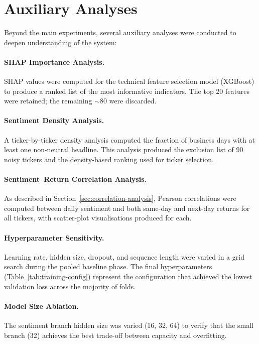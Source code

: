 \section{Auxiliary Analyses}
\label{sec:auxiliary}

Beyond the main experiments, several auxiliary analyses were conducted to
deepen understanding of the system:

\paragraph{SHAP Importance Analysis.}
SHAP values were computed for the technical feature selection model (XGBoost)
to produce a ranked list of the most informative indicators.  The top 20
features were retained; the remaining ${\sim}$80 were discarded.

\paragraph{Sentiment Density Analysis.}
A ticker-by-ticker density analysis computed the fraction of business days with
at least one non-neutral headline.  This analysis produced the exclusion list
of 90 noisy tickers and the density-based ranking used for ticker selection.

\paragraph{Sentiment--Return Correlation Analysis.}
As described in Section~\ref{sec:correlation-analysis}, Pearson correlations
were computed between daily sentiment and both same-day and next-day returns
for all tickers, with scatter-plot visualisations produced for each.

\paragraph{Hyperparameter Sensitivity.}
Learning rate, hidden size, dropout, and sequence length were varied in a grid
search during the pooled baseline phase.  The final hyperparameters
(Table~\ref{tab:training-config}) represent the configuration that achieved
the lowest validation loss across the majority of folds.

\paragraph{Model Size Ablation.}
The sentiment branch hidden size was varied (16, 32, 64) to verify that the
small branch (32) achieves the best trade-off between capacity and overfitting.


